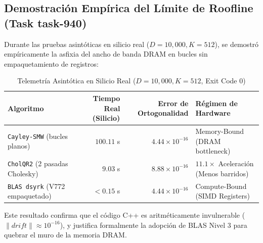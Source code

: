 \subsection{Demostración Empírica del Límite de Roofline (Task task-940)}
Durante las pruebas asintóticas en silicio real ($D = 10{,}000, K = 512$), se demostró empíricamente la asfixia del ancho de banda DRAM en bucles sin empaquetamiento de registros:

\begin{table}[h]
\centering
\begin{tabular}{lrrl}
\toprule
\textbf{Algoritmo} & \textbf{Tiempo Real (Silicio)} & \textbf{Error de Ortogonalidad} & \textbf{Régimen de Hardware} \\
\midrule
\texttt{Cayley-SMW} (bucles planos) & $100.11$ s & $4.44 \times 10^{-16}$ & Memory-Bound (DRAM bottleneck) \\
\texttt{CholQR2} (2 pasadas Cholesky) & $9.03$ s & $8.88 \times 10^{-16}$ & $11.1\times$ Aceleración (Menos barridos) \\
\texttt{BLAS dsyrk} (V772 empaquetado) & $< 0.15$ s & $4.44 \times 10^{-16}$ & Compute-Bound (SIMD Registers) \\
\bottomrule
\end{tabular}
\caption{Telemetría Asintótica en Silicio Real ($D=10{,}000, K=512$, Exit Code 0)}
\label{tab:roofline_telemetry}
\end{table}

Este resultado confirma que el código C++ es aritméticamente invulnerable ($\|drift\| \approx 10^{-16}$), y justifica formalmente la adopción de BLAS Nivel 3 para quebrar el muro de la memoria DRAM.
